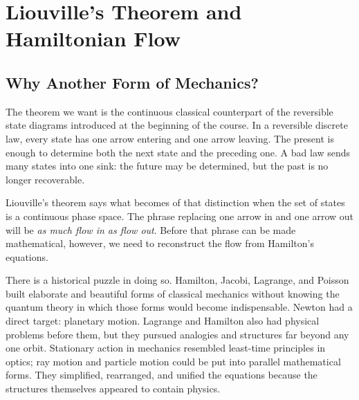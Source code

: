 \chapter{Liouville's Theorem and Hamiltonian Flow}


\section{Why Another Form of Mechanics?}

The theorem we want is the continuous classical counterpart of the reversible
state diagrams introduced at the beginning of the course.  In a reversible
discrete law, every state has one arrow entering and one arrow leaving.  The
present is enough to determine both the next state and the preceding one.  A
bad law sends many states into one sink: the future may be determined, but the
past is no longer recoverable.

Liouville's theorem says what becomes of that distinction when the set of
states is a continuous phase space.  The phrase replacing one arrow in and one
arrow out will be \emph{as much flow in as flow out}.  Before that phrase can be
made mathematical, however, we need to reconstruct the flow from Hamilton's
equations.

There is a historical puzzle in doing so.  Hamilton, Jacobi, Lagrange, and
Poisson built elaborate and beautiful forms of classical mechanics without
knowing the quantum theory in which those forms would become indispensable.
Newton had a direct target: planetary motion.  Lagrange and Hamilton also had
physical problems before them, but they pursued analogies and structures far
beyond any one orbit.  Stationary action in mechanics resembled least-time
principles in optics; ray motion and particle motion could be put into parallel
mathematical forms.  They simplified, rearranged, and unified the equations
because the structures themselves appeared to contain physics.

